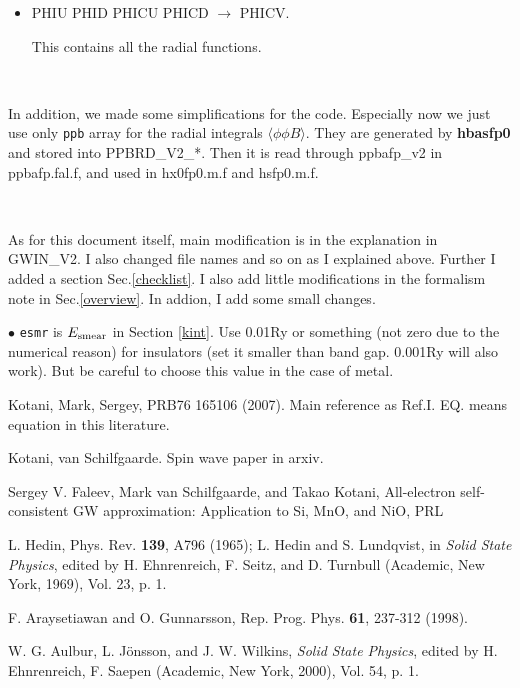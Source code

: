 \documentclass[a4paper,10pt,epsf,fleqn]{article}
\begin{document}
{{{\begin{itemize}
\item
  {\sf PHIU PHID PHICU PHICD} $\rightarrow$ {\sf PHICV}.

   This contains all the radial functions.
\end{itemize}

\ 

In addition, we made some simplifications for the code. 
Especially now we just use only \verb#ppb# array 
for the radial integrals $\langle \phi \phi B \rangle$.
They are generated by {\bf hbasfp0} and stored into
{\sf PPBRD\_V2\_*}. Then it is read through {\sf ppbafp\_v2} in 
{\sf ppbafp.fal.f}, and used in {\sf hx0fp0.m.f} and {\sf hsfp0.m.f}.

\ 

As for this document itself, main modification is
in the explanation in {\sf GWIN\_V2}.
I also changed file names and so on as I explained above.
Further I added a section Sec.\ref{checklist}.
I also add little modifications in the formalism note 
in Sec.\ref{overview}. In addion, I add some small changes.



\vspace{5mm}
\noindent $\bullet$ {\tt esmr} is $E_{\rm smear}$ in 
Section \ref{kint}. Use 0.01Ry or something
(not zero due to the numerical reason) for
insulators (set it smaller than band gap. 0.001Ry will also work).
But be careful to choose this value in the case of metal.



\newpage
\baselineskip=4mm
\begin{thebibliography}{00}
Kotani, Mark, Sergey,
PRB76 165106 (2007). Main reference as Ref.I. 
EQ. means equation in this literature.

Kotani, van Schilfgaarde. Spin wave paper in arxiv.

Sergey V. Faleev, Mark van Schilfgaarde, and Takao Kotani,
All-electron self-consistent GW approximation: Application to Si, MnO, and NiO, PRL

 L. Hedin, Phys. Rev. {\bf139}, A796 (1965);
 L. Hedin and S. Lundqvist, in {\sl Solid State Physics}, edited by
 H. Ehnrenreich, F. Seitz, and D. Turnbull (Academic, New York, 1969),
 Vol. 23, p. 1.

 F. Araysetiawan and O. Gunnarsson,
 Rep. Prog. Phys. {\bf 61}, 237-312 (1998).

 W. G. Aulbur, L. J\"onsson, and J. W. Wilkins,
 {\sl Solid State Physics}, edited by
 H. Ehnrenreich, F. Saepen (Academic, New York, 2000),
 Vol. 54, p. 1.


\end{thebibliography}}}}
\end{document}
